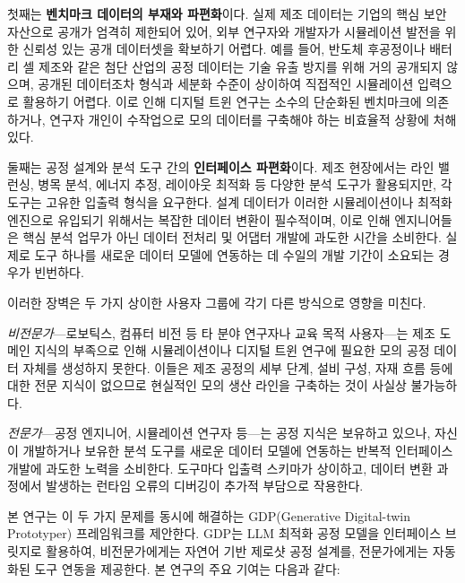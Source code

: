 첫째는 \textbf{벤치마크 데이터의 부재와 파편화}이다. 실제 제조 데이터는 기업의 핵심 보안 자산으로 공개가 엄격히 제한되어 있어, 외부 연구자와 개발자가 시뮬레이션 발전을 위한 신뢰성 있는 공개 데이터셋을 확보하기 어렵다. 예를 들어, 반도체 후공정이나 배터리 셀 제조와 같은 첨단 산업의 공정 데이터는 기술 유출 방지를 위해 거의 공개되지 않으며, 공개된 데이터조차 형식과 세분화 수준이 상이하여 직접적인 시뮬레이션 입력으로 활용하기 어렵다. 이로 인해 디지털 트윈 연구는 소수의 단순화된 벤치마크에 의존하거나, 연구자 개인이 수작업으로 모의 데이터를 구축해야 하는 비효율적 상황에 처해 있다.

둘째는 공정 설계와 분석 도구 간의 \textbf{인터페이스 파편화}이다. 제조 현장에서는 라인 밸런싱, 병목 분석, 에너지 추정, 레이아웃 최적화 등 다양한 분석 도구가 활용되지만, 각 도구는 고유한 입출력 형식을 요구한다. 설계 데이터가 이러한 시뮬레이션이나 최적화 엔진으로 유입되기 위해서는 복잡한 데이터 변환이 필수적이며, 이로 인해 엔지니어들은 핵심 분석 업무가 아닌 데이터 전처리 및 어댑터 개발에 과도한 시간을 소비한다. 실제로 도구 하나를 새로운 데이터 모델에 연동하는 데 수일의 개발 기간이 소요되는 경우가 빈번하다.

이러한 장벽은 두 가지 상이한 사용자 그룹에 각기 다른 방식으로 영향을 미친다.

\textit{비전문가}---로보틱스, 컴퓨터 비전 등 타 분야 연구자나 교육 목적 사용자---는 제조 도메인 지식의 부족으로 인해 시뮬레이션이나 디지털 트윈 연구에 필요한 모의 공정 데이터 자체를 생성하지 못한다. 이들은 제조 공정의 세부 단계, 설비 구성, 자재 흐름 등에 대한 전문 지식이 없으므로 현실적인 모의 생산 라인을 구축하는 것이 사실상 불가능하다.

\textit{전문가}---공정 엔지니어, 시뮬레이션 연구자 등---는 공정 지식은 보유하고 있으나, 자신이 개발하거나 보유한 분석 도구를 새로운 데이터 모델에 연동하는 반복적 인터페이스 개발에 과도한 노력을 소비한다. 도구마다 입출력 스키마가 상이하고, 데이터 변환 과정에서 발생하는 런타임 오류의 디버깅이 추가적 부담으로 작용한다.

본 연구는 이 두 가지 문제를 동시에 해결하는 GDP(Generative Digital-twin Prototyper) 프레임워크를 제안한다. GDP는 LLM 최적화 공정 모델을 인터페이스 브릿지로 활용하여, 비전문가에게는 자연어 기반 제로샷 공정 설계를, 전문가에게는 자동화된 도구 연동을 제공한다. 본 연구의 주요 기여는 다음과 같다:

